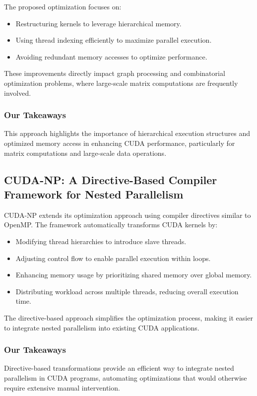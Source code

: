 \documentclass[12pt]{article}
\begin{document}
The proposed optimization focuses on:
\begin{itemize}
    \item Restructuring kernels to leverage hierarchical memory.
    \item Using thread indexing efficiently to maximize parallel execution.
    \item Avoiding redundant memory accesses to optimize performance.
\end{itemize}

These improvements directly impact graph processing and combinatorial optimization problems, where large-scale matrix computations are frequently involved.

\subsubsection{Our Takeaways}
This approach highlights the importance of hierarchical execution structures and optimized memory access in enhancing CUDA performance, particularly for matrix computations and large-scale data operations.

\subsection{CUDA-NP: A Directive-Based Compiler Framework for Nested Parallelism}

CUDA-NP extends its optimization approach using compiler directives similar to OpenMP. The framework automatically transforms CUDA kernels by:
\begin{itemize}
    \item Modifying thread hierarchies to introduce slave threads.
    \item Adjusting control flow to enable parallel execution within loops.
    \item Enhancing memory usage by prioritizing shared memory over global memory.
    \item Distributing workload across multiple threads, reducing overall execution time.
\end{itemize}

The directive-based approach simplifies the optimization process, making it easier to integrate nested parallelism into existing CUDA applications.

\subsubsection{Our Takeaways}
Directive-based transformations provide an efficient way to integrate nested parallelism in CUDA programs, automating optimizations that would otherwise require extensive manual intervention.
\end{document}
